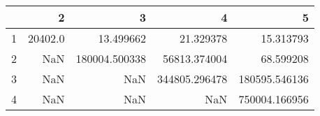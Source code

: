 \begin{tabular}{lrrrr}
\toprule
{} &        2 &              3 &              4 &              5 \\
\midrule
1 &  20402.0 &      13.499662 &      21.329378 &      15.313793 \\
2 &      NaN &  180004.500338 &   56813.374004 &      68.599208 \\
3 &      NaN &            NaN &  344805.296478 &  180595.546136 \\
4 &      NaN &            NaN &            NaN &  750004.166956 \\
\bottomrule
\end{tabular}
